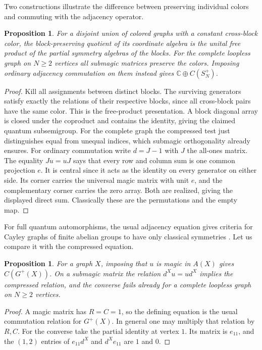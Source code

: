 \documentclass[11pt,a4paper]{article}
\newtheorem{prop}[thm]{Proposition}
\begin{document}
Two constructions illustrate the difference between preserving individual colors and commuting with the adjacency operator.

\begin{prop}\label{blocks}
For a disjoint union of colored graphs with a constant cross-block color, the block-preserving quotient of its coordinate algebra is the unital free product of the partial symmetry algebras of the blocks. For the complete loopless graph on $N\geq2$ vertices all submagic matrices preserve the colors. Imposing ordinary adjacency commutation on them instead gives $\mathbb C\oplus C(S_N^+)$.
\end{prop}
\begin{proof}
Kill all assignments between distinct blocks. The surviving generators satisfy exactly the relations of their respective blocks, since all cross-block pairs have the same color. This is the free-product presentation. A block diagonal array is closed under the coproduct and contains the identity, giving the claimed quantum subsemigroup. For the complete graph the compressed test just distinguishes equal from unequal indices, which submagic orthogonality already ensures. For ordinary commutation write $d=J-1$ with $J$ the all-ones matrix. The equality $Ju=uJ$ says that every row and column sum is one common projection $e$. It is central since it acts as the identity on every generator on either side. Its corner carries the universal magic matrix with unit $e$, and the complementary corner carries the zero array. Both are realized, giving the displayed direct sum. Classically these are the permutations and the empty map.
\end{proof}

For full quantum automorphisms, the usual adjacency equation gives criteria for Cayley graphs of finite abelian groups to have only classical symmetries \cite{cayley}. Let us compare it with the compressed equation.

\begin{prop}
For a graph $X$, imposing that $u$ is magic in $A(X)$ gives $C(G^+(X))$. On a submagic matrix the relation $d^Xu=ud^X$ implies the compressed relation, and the converse fails already for a complete loopless graph on $N\geq2$ vertices.
\end{prop}
\begin{proof}
A magic matrix has $R=C=1$, so the defining equation is the usual commutation relation for $G^+(X)$. In general one may multiply that relation by $R,C$. For the converse take the partial identity at vertex $1$. Its matrix is $e_{11}$, and the $(1,2)$ entries of $e_{11}d^X$ and $d^Xe_{11}$ are $1$ and $0$.
\end{proof}
\end{document}
